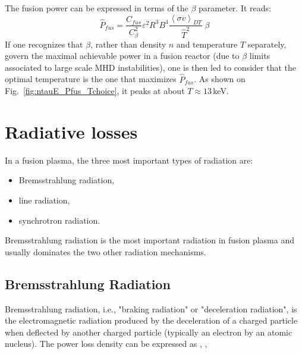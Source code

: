 The fusion power can be expressed in terms of the $\beta$ parameter. It reads:
\begin{equation}
\hat P_{fus} = \frac{C_{fus}}{C_\beta^2} \varepsilon^2 R^3 B^4 
 \frac{\left< \sigma v \right>_{DT}}{\hat T^2}\; \beta 
\end{equation}
If one recognizes that $\beta$, rather than density $n$ and temperature $T$ separately, govern the maximal achievable power in a fusion reactor (due to $\beta$ limits associated to large scale MHD instabilities), one is then led to consider that the optimal temperature is the one that maximizes $\hat P_{fus}$. As shown on Fig.~\ref{fig:ntauE_Pfus_Tchoice}, it peaks at about $T\approx 13\,$keV.

\section{Radiative losses}
\label{appendix:radiative_losses}
In a fusion plasma, the three most important types of radiation are: 
\begin{itemize}
	\item Bremsstrahlung radiation, 
	\item line radiation, 
	\item synchrotron radiation.
\end{itemize}

Bremsstrahlung radiation is the most important radiation in fusion plasma and usually dominates the two other radiation mechanisms. 

\subsection{Bremsstrahlung Radiation}
Bremsstrahlung radiation, i.e., "braking radiation" or "deceleration radiation", is the electromagnetic radiation produced by the deceleration of a charged particle when deflected by another charged particle (typically an electron by an atomic nucleus). The power loss density can be expressed as \cite[sec.3.3]{FusionCEA1987}, \cite[sec.4.24]{Wesson2004}, \cite[sec.3.5.4]{Freidberg2007}

